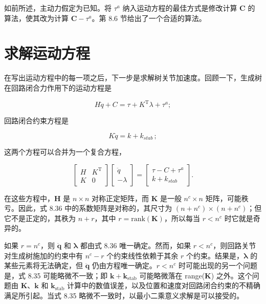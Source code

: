 \documentclass[10pt,a4paper]{book}
\theoremstyle{thmstyle} %
\theoremstyle{defstyle} %
\theoremstyle{prostyle} %
\begin{document}
如前所述，主动力假定为已知。将 $\tau^{a}$ 纳入运动方程的最佳方式是修改计算 $\mathbf{C}$ 的算法，使其改为计算 $\mathbf{C} - \tau^{a}$。第 8.6 节给出了一个合适的算法。



\section{求解运动方程}





在写出运动方程中的每一项之后，下一步是求解树关节加速度。回顾一下，生成树在回路闭合力作用下的运动方程是



$$
H \ddot { q } + C = \tau + K ^{\mathrm { T} } \lambda + \tau ^{a} ;
$$



回路闭合约束方程是



$$
K \ddot { q } = k + k _ { s t a b } \, ;
$$



这两个方程可以合并为一个复合方程，



$$
\left[ \begin{array}{ll} { H } & { K ^{\mathrm { T} } } \\{ K } & { 0 } \end{array} \right] \left[ \begin{array}{l} { \ddot { q } } \\{ - \lambda } \end{array} \right] = \left[ \begin{array}{l} { \tau - C + \tau ^{a} } \\{ k + k _ { s t a b } } \end{array} \right] .
$$



在这些方程中，$\boldsymbol{H}$ 是 $n \times n$ 对称正定矩阵，而 $\boldsymbol{K}$ 是一般 $n^{c} \times n$ 矩阵，可能秩亏。因此，式 8.36 中的系数矩阵是对称的，其尺寸为 $(n+n^{c}) \times (n+n^{c})$；但它不是正定的，其秩为 $n+r$，其中 $r = \text{rank}(\boldsymbol{K})$，所以每当 $r < n^{c}$ 时它就是奇异的。



如果 $r=n^{c}$，则 $\ddot{\boldsymbol{q}}$ 和 $\boldsymbol{\lambda}$ 都由式 8.36 唯一确定。然而，如果 $r<n^{c}$，则回路关节对生成树施加的约束中有 $n^{c}-r$ 个约束线性依赖于其余 $r$ 个约束。结果是，$\boldsymbol{\lambda}$ 的某些元素将无法确定，但 $\ddot{\boldsymbol{q}}$ 仍由方程唯一确定。$r<n^{c}$ 时可能出现的另一个问题是，式 8.35 可能略微不一致；即 $\boldsymbol{k}+\boldsymbol{k}_{\mathrm{stab}}$ 可能略微落在 range($\boldsymbol{K}$) 之外。这个问题由 $\boldsymbol{K}$、$\boldsymbol{k}$ 和 $\boldsymbol{k}_{\mathrm{stab}}$ 计算中的数值误差，以及位置和速度对回路闭合约束的不精确满足所引起。当式 8.35 略微不一致时，以最小二乘意义求解是可以接受的。
\end{document}
